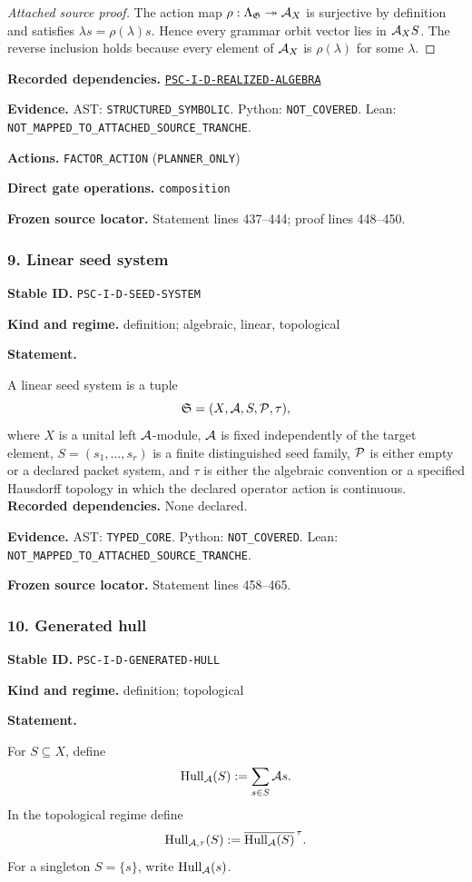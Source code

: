 \documentclass[a4paper,11pt]{article}
\newcommand{\Hull}{\operatorname{Hull}}\newcommand{\srank}{\operatorname{srank}}\newcommand{\psrank}{\operatorname{psrank}}\newcommand{\End}{\operatorname{End}}\newcommand{\Hom}{\operatorname{Hom}}\newcommand{\im}{\operatorname{im}}\newcommand{\Ker}{\operatorname{Ker}}\newcommand{\Jac}{\operatorname{Jac}}\newcommand{\Irr}{\operatorname{Irr}}\newcommand{\Span}{\operatorname{span}}\newcommand{\alg}{\operatorname{alg}}\newcommand{\Reach}{\operatorname{Reach}}\newcommand{\Supp}{\operatorname{Supp}}\newcommand{\id}{\mathrm{id}}\newcommand{\cl}[1]{\overline{#1}}
\newcommand{\field}[2]{\noindent\textbf{#1.} #2\par}
\begin{document}
\begin{proof}[Attached source proof]
The action map $\rho:\Lambda_{\mathfrak G}\twoheadrightarrow\mathcal A_X$ is surjective by definition and satisfies $\lambda s=\rho(\lambda)s$.  Hence every grammar orbit vector lies in $\mathcal A_XS$.  The reverse inclusion holds because every element of $\mathcal A_X$ is $\rho(\lambda)$ for some $\lambda$.
\end{proof}
\field{Recorded dependencies}{\hyperref[rec:PSC-I-D-REALIZED-ALGEBRA]{\nolinkurl{PSC-I-D-REALIZED-ALGEBRA}}}
\field{Evidence}{AST: \nolinkurl{STRUCTURED_SYMBOLIC}. Python: \nolinkurl{NOT_COVERED}. Lean: \nolinkurl{NOT_MAPPED_TO_ATTACHED_SOURCE_TRANCHE}.}
\field{Actions}{\nolinkurl{FACTOR_ACTION} (\nolinkurl{PLANNER_ONLY})}
\field{Direct gate operations}{\nolinkurl{composition}}
\field{Frozen source locator}{Statement lines 437--444; proof lines 448--450.}
\subsubsection*{9. Linear seed system}
\label{rec:PSC-I-D-SEED-SYSTEM}
\field{Stable ID}{\nolinkurl{PSC-I-D-SEED-SYSTEM}}
\field{Kind and regime}{definition; algebraic, linear, topological}
\textbf{Statement.}\par
A linear seed system is a tuple
\[
\mathfrak S=(X,\mathcal A,S,\mathcal P,\tau),
\]
where $X$ is a unital left $\mathcal A$-module, $\mathcal A$ is fixed independently of the target element, $S=(s_1,\ldots,s_r)$ is a finite distinguished seed family, $\mathcal P$ is either empty or a declared packet system, and $\tau$ is either the algebraic convention or a specified Hausdorff topology in which the declared operator action is continuous.
\field{Recorded dependencies}{None declared.}
\field{Evidence}{AST: \nolinkurl{TYPED_CORE}. Python: \nolinkurl{NOT_COVERED}. Lean: \nolinkurl{NOT_MAPPED_TO_ATTACHED_SOURCE_TRANCHE}.}
\field{Frozen source locator}{Statement lines 458--465.}
\subsubsection*{10. Generated hull}
\label{rec:PSC-I-D-GENERATED-HULL}
\field{Stable ID}{\nolinkurl{PSC-I-D-GENERATED-HULL}}
\field{Kind and regime}{definition; topological}
\textbf{Statement.}\par
For $S\subseteq X$, define
\[
\Hull_{\A}(S):=\sum_{s\in S}\A s.
\]
In the topological regime define
\[
\Hull_{\A,\tau}(S):=\cl{\Hull_{\A}(S)}^{\,\tau}.
\]
For a singleton $S=\{s\}$, write $\Hull_{\A}(s)$.
\end{document}
